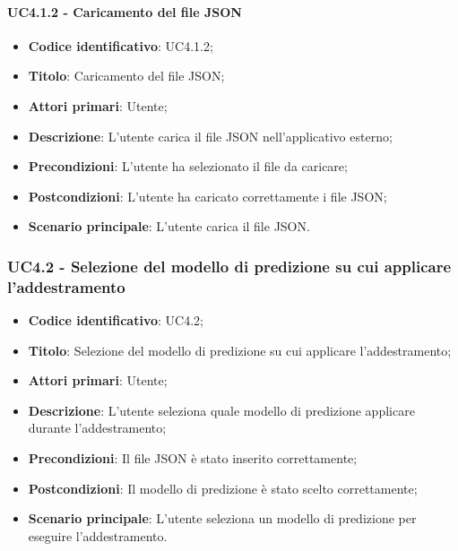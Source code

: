 \paragraph{UC4.1.2 - Caricamento del file JSON}
\begin{itemize}
	\item \textbf{Codice identificativo}: UC4.1.2;
	\item \textbf{Titolo}: Caricamento del file JSON;
	\item \textbf{Attori primari}: Utente;
	\item \textbf{Descrizione}: L'utente carica il file JSON nell'applicativo esterno;
	\item \textbf{Precondizioni}: L'utente ha selezionato il file da caricare;
	\item \textbf{Postcondizioni}: L'utente ha caricato correttamente i file JSON;
	\item \textbf{Scenario principale}: L'utente carica il file JSON.
\end{itemize}

\subsubsection{UC4.2 - Selezione del modello di predizione su cui applicare l'addestramento}
\begin{itemize}
    \item \textbf{Codice identificativo}: UC4.2;
    \item \textbf{Titolo}: Selezione del modello di predizione su cui applicare l'addestramento;
    \item \textbf{Attori primari}: Utente;
    \item \textbf{Descrizione}: L'utente seleziona quale modello di predizione applicare durante l'addestramento;
    \item \textbf{Precondizioni}: Il file JSON è stato inserito correttamente;
    \item \textbf{Postcondizioni}: Il modello di predizione è stato scelto correttamente;
    \item \textbf{Scenario principale}: L'utente seleziona un modello di predizione per eseguire l'addestramento.   
\end{itemize}

